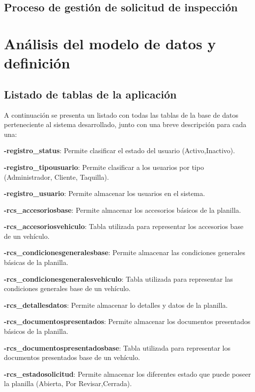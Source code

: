 \subsection{Proceso de gestión de solicitud de inspección}
\setlength{\parskip}{5mm}
\setlength{\parskip}{0mm}


\section{Análisis del modelo de datos y definición} 
\setlength{\parskip}{5mm}
\setlength{\parskip}{0mm}

\subsection{Listado de tablas de la aplicación}

\setlength{\parskip}{5mm}

A continuación se presenta un listado con todas las tablas de la base de datos perteneciente al sistema desarrollado, junto con una breve descripción para cada una:


\textbf{-registro\_status}: Permite clasificar el estado del usuario (Activo,Inactivo).

\textbf{-registro\_tipousuario}: Permite clasificar a los usuarios por tipo (Administrador, Cliente, Taquilla).

\textbf{-registro\_usuario}: Permite almacenar los usuarios en el sistema.

\textbf{-rcs\_accesoriosbase}: Permite almacenar los accesorios básicos de la planilla.

\textbf{-rcs\_accesoriosvehiculo}: Tabla utilizada para representar los accesorios base de un vehículo.

\textbf{-rcs\_condicionesgeneralesbase}: Permite almacenar las condiciones generales básicas de la planilla.

\textbf{-rcs\_condicionesgeneralesvehiculo}: Tabla utilizada para representar las condiciones generales base de un vehículo.

\textbf{-rcs\_detallesdatos}: Permite almacenar lo detalles y datos de la planilla.

\textbf{-rcs\_documentospresentados}: Permite almacenar los documentos presentados básicos de la planilla.

\textbf{-rcs\_documentospresentadosbase}: Tabla utilizada para representar los documentos presentados base de un vehículo.

\textbf{-rcs\_estadosolicitud}: Permite almacenar los diferentes estado que puede poseer la planilla (Abierta, Por Revisar,Cerrada).

